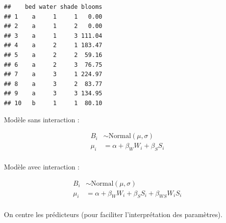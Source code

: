 \documentclass[
  a4paper,11pt,twoside,onecolumn,openright,final,oldfontcommands]{memoir}
\newenvironment{Shaded}{\begin{snugshade}}{\end{snugshade}}
\newcommand{\KeywordTok}[1]{\textcolor[rgb]{0.13,0.29,0.53}{\textbf{#1}}}
\newcommand{\NormalTok}[1]{#1}
\newcommand{\OperatorTok}[1]{\textcolor[rgb]{0.81,0.36,0.00}{\textbf{#1}}}
\newcommand{\StringTok}[1]{\textcolor[rgb]{0.31,0.60,0.02}{#1}}
\theoremstyle{definition}
\theoremstyle{definition}
\theoremstyle{definition}
\theoremstyle{remark}
\begin{document}
\begin{verbatim}
##    bed water shade blooms
## 1    a     1     1   0.00
## 2    a     1     2   0.00
## 3    a     1     3 111.04
## 4    a     2     1 183.47
## 5    a     2     2  59.16
## 6    a     2     3  76.75
## 7    a     3     1 224.97
## 8    a     3     2  83.77
## 9    a     3     3 134.95
## 10   b     1     1  80.10
\end{verbatim}

Modèle sans interaction :

\[
\begin{aligned}
B_{i} &\sim \mathrm{Normal}(\mu, \sigma) \\
\mu_{i} &= \alpha + \beta_{W} W_{i} + \beta_{S} S_{i} \\
\end{aligned}
\]

Modèle avec interaction :

\[
\begin{aligned}
B_{i} &\sim \mathrm{Normal}(\mu, \sigma) \\
\mu_{i} &= \alpha + \beta_{W} W_{i} + \beta_{S} S_{i} + \beta_{WS} W_{i} S_{i}\\
\end{aligned}
\]

On centre les prédicteurs (pour faciliter l'interprétation des paramètres).

\begin{Shaded}
\end{Shaded}
\end{document}
